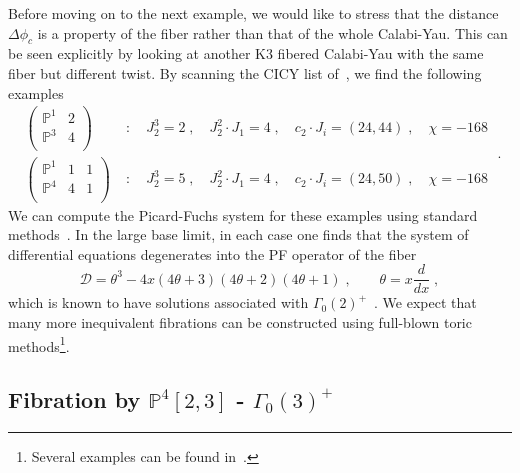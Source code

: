 \documentclass[11pt,a4paper]{article}
\numberwithin{equation}{section}
\numberwithin{table}{section}\setlength{\multlinegap}{25pt}
\begin{document}
Before moving on to the next example, we would like to stress that the distance $\Delta\phi_c$ is a property of the fiber rather than that of the whole Calabi-Yau. This can be seen explicitly by looking at another K3 fibered Calabi-Yau with the same fiber but different twist. By scanning the CICY list of~\cite{Anderson:2017aux}, we find the following examples
\begin{equation}
    \begin{aligned}
    \left(
    \begin{array}{c|ccc}
        \mathbb{P}^1 & 2\\
        \mathbb{P}^3 & 4\\
    \end{array}
    \right)\;&:\quad
    J_2^3=2\;,\quad J_2^2\cdot J_1=4\;,\quad
    c_2\cdot J_i=(24,44)\;,\quad\chi=-168
    \\
    \left(
    \begin{array}{c|ccc}
        \mathbb{P}^1 & 1 & 1\\
        \mathbb{P}^4 & 4 & 1\\
    \end{array}
    \right)\;&:\quad
    J_2^3=5\;,\quad J_2^2\cdot J_1=4\;,\quad
    c_2\cdot J_i=(24,50)\;,\quad\chi=-168
    \end{aligned}\;.
\end{equation}
We can compute the Picard-Fuchs system for these examples using standard methods~\cite{Hosono:1994ax}. In the large base limit, in each case one finds that the system of differential equations degenerates into the PF operator of the fiber
\begin{equation}
    \mathcal{D}=\theta^3-4x(4\theta+3)(4\theta+2)(4\theta+1)\;,\qquad \theta=x\frac{d}{dx}\;,
\end{equation}
which is known to have solutions associated with $\Gamma_0(2)^+$~\cite{Lian:1995js,Klemm:1995tj}. We expect that many more inequivalent fibrations can be constructed using full-blown toric methods\footnote{Several examples can be found in~\cite{Klemm:2004km}.}.


\subsection{Fibration by \texorpdfstring{$\mathbb{P}^4[2,3]$}{codimension 2 K3} - \texorpdfstring{$\Gamma_0(3)^+$}{Gamma0+(3)}}
\label{subsec:112222}
\end{document}
